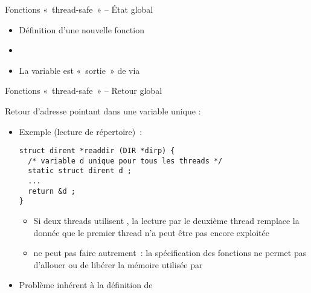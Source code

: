 \begin {frame} {Fonctions «~thread-safe~» -- État global}

    \begin {itemize}
	\item Définition d'une nouvelle fonction

	\item {}

	\item La variable  est «~sortie~» de
	     via 

    \end {itemize}

\end {frame}

%
%
%
%


\begin {frame} [fragile] {Fonctions «~thread-safe~» -- Retour global}

    Retour d'adresse pointant dans une variable unique :

    \begin {itemize}

	\item Exemple (lecture de répertoire)~:
\begin {lstlisting}
struct dirent *readdir (DIR *dirp) {
  /* variable d unique pour tous les threads */
  static struct dirent d ;
  ...
  return &d ;
}
\end{lstlisting}

	    \begin {itemize}
		\item Si deux threads utilisent , la
		    lecture par le deuxième thread remplace la donnée
		    que le premier thread n'a peut être pas encore
		    exploitée

		\item {} ne peut pas faire autrement~:
		    la spécification des fonctions 
		    ne permet pas d'allouer ou de libérer la mémoire
		    utilisée par 

	    \end {itemize}

	\item Problème inhérent à la définition de 

    \end {itemize}
\end{frame}


